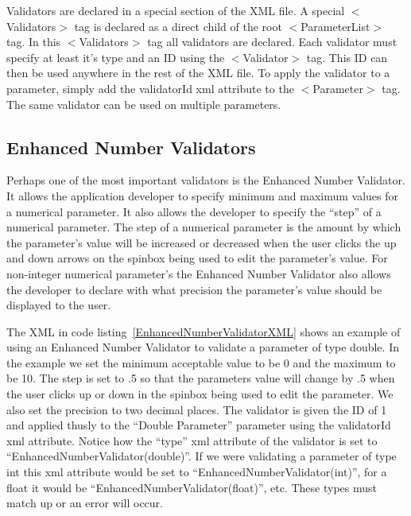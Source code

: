 Validators are declared in a special section of the XML file. A special $<$Validators$>$ tag is declared as a direct child
of the root $<$ParameterList$>$ tag. In this $<$Validators$>$ tag all validators are declared. Each validator must specify at
least it's type and an ID using the $<$Validator$>$ tag. This ID can then be used anywhere in the rest of the XML file. 
To apply the validator to a parameter, simply add the validatorId xml attribute to the $<$Parameter$>$ tag. The same validator 
can be used on multiple parameters.

\subsection{Enhanced Number Validators}
Perhaps one of the most important validators is the Enhanced Number Validator. It allows the application developer
to specify minimum and maximum values for a numerical parameter. It also allows the developer to specify the
``step'' of a numerical parameter. The step of a numerical parameter is the amount by which the parameter's value
will be increased or decreased when the user clicks the up and down arrows on the spinbox being used to edit
the parameter's value. For non-integer numerical parameter's the Enhanced Number Validator also allows the
developer to declare with what precision the parameter's value should be displayed to the user.

The XML in code listing~\ref{EnhancedNumberValidatorXML} shows an example of using an Enhanced Number Validator
to validate a parameter of type double. In the example we set the minimum acceptable value to be 0 and the 
maximum to be 10. The step is set to .5 so that the parameters value will change by .5 when the user clicks
up or down in the spinbox being used to edit the parameter. We also set the precision to two decimal places.
The validator is given the ID of 1 and applied thusly to the ``Double Parameter'' parameter using the validatorId
xml attribute. Notice how the ``type'' xml attribute of the validator is set to ``EnhancedNumberValidator(double)''. If we 
were validating a parameter of type int this xml attribute would be set to ``EnhancedNumberValidator(int)'', 
for a float it would be ``EnhancedNumberValidator(float)'', etc. These types must match up or an error will
occur.

